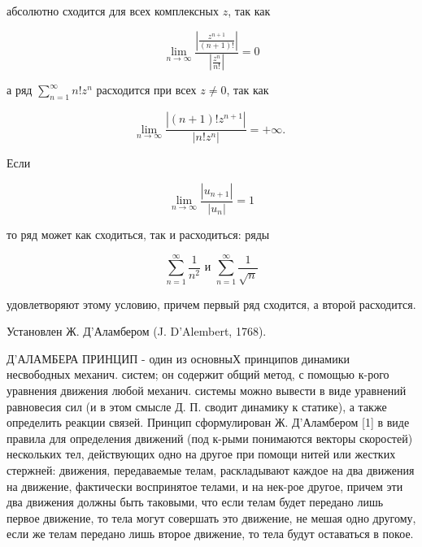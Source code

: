 \documentclass[10pt]{article}
\begin{document}
абсолютно сходится для всех комплексных $z$, так как



\[

\lim _{n \rightarrow \infty} \frac{\left|\frac{z^{n+1}}{(n+1) !}\right|}{\left|\frac{z^{n}}{n !}\right|}=0

\]



а ряд $\sum_{n=1}^{\infty} n ! z^{n}$ расходится при всех $z \neq 0$, так как



\[

\lim _{n \rightarrow \infty} \frac{\left|(n+1) ! z^{n+1}\right|}{\left|n ! z^{n}\right|}=+\infty \text {. }

\]



Если



\[

\lim _{n \rightarrow \infty} \frac{\left|u_{n+1}\right|}{\left|u_{n}\right|}=1

\]



то ряд может как сходиться, так и расходиться: ряды



\[

\sum_{n=1}^{\infty} \frac{1}{n^{2}} \text { и } \sum_{n=1}^{\infty} \frac{1}{\sqrt{n}}

\]



удовлетворяют этому условию, причем первый ряд сходится, а второй расходится.



Установлен Ж. Д'Аламбером (J. D'Alembert, 1768).



Д'АЛАМБЕРА ПРИНЦИП - один из основныХ принципов динамики несвободных механич. систем; он содержит общий метод, с помощью к-рого уравнения движения любой механич. системы можно вывести в виде уравнений равновесия сил (и в этом смысле Д. П. сводит динамику к статике), а также определить реакции связей. Принцип сформулирован Ж. Д'Аламбером [1] в виде правила для определения движений (под к-рыми понимаются векторы скоростей) нескольких тел, действующих одно на другое при помощи нитей или жестких стержней: движения, передаваемые телам, раскладывают каждое на два движения на движение, фактически воспринятое телами, и на нек-рое другое, причем эти два движения должны быть таковыми, что если телам будет передано лишь первое движение, то тела могут совершать это движение, не мешая одно другому, если же телам передано лишь второе движение, то тела будут оставаться в покое.
\end{document}

